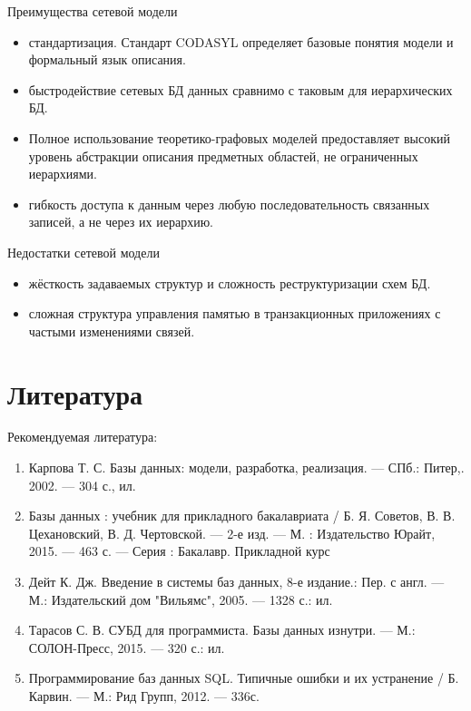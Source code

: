 \documentclass{beamer}
\begin{document}
\begin{frame}
\begin{block}{Преимущества сетевой модели}
\begin{itemize}
\item стандартизация. Стандарт CODASYL определяет базовые понятия модели и формальный язык описания.
\item быстродействие сетевых БД данных сравнимо с таковым для иерархических БД.
\item Полное использование теоретико-графовых моделей предоставляет высокий уровень абстракции описания предметных областей, не ограниченных иерархиями.
\item гибкость доступа к данным через любую последовательность связанных записей, а не через их иерархию.
\end{itemize}
\end{block}
\begin{block}{Недостатки сетевой модели}
\begin{itemize}
\item жёсткость задаваемых структур и сложность реструктуризации схем БД.
\item сложная структура управления памятью в транзакционных приложениях с частыми изменениями связей.
\end{itemize}
\end{block}
\end{frame}

\section*{Литература}
\begin{frame}   
Рекомендуемая литература:
\begin{enumerate}
\item Карпова Т. С. Базы данных: модели, разработка, реализация. — СПб.: Питер,. 2002. — 304 с., ил.
\item Базы данных : учебник для прикладного бакалавриата / Б. Я. Советов, В. В. Цехановский, В. Д. Чертовской. — 2-е изд. — М. : Издательство Юрайт, 2015. — 463 с. — Серия : Бакалавр. Прикладной курс
\item Дейт К. Дж. Введение в системы баз данных, 8-е издание.: Пер. с англ. — М.: Издательский дом "Вильямс", 2005. — 1328 с.: ил.
\item Тарасов С. В. СУБД для программиста. Базы данных изнутри. — М.: СОЛОН-Пресс, 2015. — 320 с.: ил.
\item Программирование  баз  данных  SQL.  Типичные  ошибки  и  их устранение  /  Б.  Карвин.  —  М.:  Рид  Групп,  2012.  — 336с. 
\end{enumerate}
\end{frame}   
\end{document}
